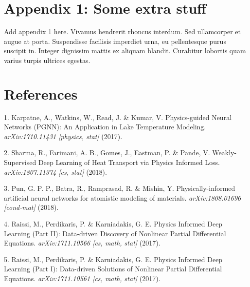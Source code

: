 \documentclass[12pt,a4paper,]{harvard-thesis}
\begin{document}
\hypertarget{appendix-1-some-extra-stuff}{%
\chapter*{Appendix 1: Some extra
stuff}\label{appendix-1-some-extra-stuff}}

Add appendix 1 here. Vivamus hendrerit rhoncus interdum. Sed ullamcorper
et augue at porta. Suspendisse facilisis imperdiet urna, eu pellentesque
purus suscipit in. Integer dignissim mattis ex aliquam blandit.
Curabitur lobortis quam varius turpis ultrices egestas.

\footnotesize

\hypertarget{references}{%
\chapter*{References}\label{references}}

\hypertarget{refs}{}
\leavevmode\hypertarget{ref-karpatne_physics-guided_2017}{}%
1. Karpatne, A., Watkins, W., Read, J. \& Kumar, V. Physics-guided
Neural Networks (PGNN): An Application in Lake Temperature Modeling.
\emph{arXiv:1710.11431 {[}physics, stat{]}} (2017).

\leavevmode\hypertarget{ref-sharma_weakly-supervised_2018}{}%
2. Sharma, R., Farimani, A. B., Gomes, J., Eastman, P. \& Pande, V.
Weakly-Supervised Deep Learning of Heat Transport via Physics Informed
Loss. \emph{arXiv:1807.11374 {[}cs, stat{]}} (2018).

\leavevmode\hypertarget{ref-pun_physically-informed_2018}{}%
3. Pun, G. P. P., Batra, R., Ramprasad, R. \& Mishin, Y.
Physically-informed artificial neural networks for atomistic modeling of
materials. \emph{arXiv:1808.01696 {[}cond-mat{]}} (2018).

\leavevmode\hypertarget{ref-raissi_physics_2017}{}%
4. Raissi, M., Perdikaris, P. \& Karniadakis, G. E. Physics Informed
Deep Learning (Part II): Data-driven Discovery of Nonlinear Partial
Differential Equations. \emph{arXiv:1711.10566 {[}cs, math, stat{]}}
(2017).

\leavevmode\hypertarget{ref-raissi_physics_2017-1}{}%
5. Raissi, M., Perdikaris, P. \& Karniadakis, G. E. Physics Informed
Deep Learning (Part I): Data-driven Solutions of Nonlinear Partial
Differential Equations. \emph{arXiv:1711.10561 {[}cs, math, stat{]}}
(2017).
\end{document}
